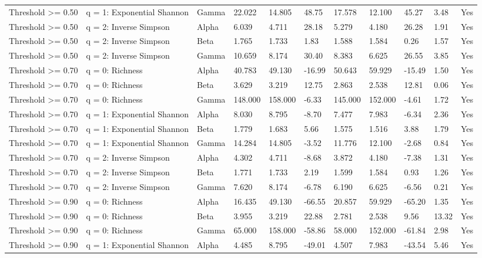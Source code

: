 \begin{landscape}
\begin{longtable}{L{3.0cm}L{2.4cm}L{1.5cm}*{6}{C{1.25cm}}C{1.65cm}C{1.35cm}}
Threshold >= 0.50 & q = 1: Exponential Shannon & Gamma & 22.022 & 14.805 & 48.75 & 17.578 & 12.100 & 45.27 & 3.48 & Yes \\
Threshold >= 0.50 & q = 2: Inverse Simpson & Alpha & 6.039 & 4.711 & 28.18 & 5.279 & 4.180 & 26.28 & 1.91 & Yes \\
Threshold >= 0.50 & q = 2: Inverse Simpson & Beta & 1.765 & 1.733 & 1.83 & 1.588 & 1.584 & 0.26 & 1.57 & Yes \\
Threshold >= 0.50 & q = 2: Inverse Simpson & Gamma & 10.659 & 8.174 & 30.40 & 8.383 & 6.625 & 26.55 & 3.85 & Yes \\
Threshold >= 0.70 & q = 0: Richness & Alpha & 40.783 & 49.130 & -16.99 & 50.643 & 59.929 & -15.49 & 1.50 & Yes \\
Threshold >= 0.70 & q = 0: Richness & Beta & 3.629 & 3.219 & 12.75 & 2.863 & 2.538 & 12.81 & 0.06 & Yes \\
Threshold >= 0.70 & q = 0: Richness & Gamma & 148.000 & 158.000 & -6.33 & 145.000 & 152.000 & -4.61 & 1.72 & Yes \\
Threshold >= 0.70 & q = 1: Exponential Shannon & Alpha & 8.030 & 8.795 & -8.70 & 7.477 & 7.983 & -6.34 & 2.36 & Yes \\
Threshold >= 0.70 & q = 1: Exponential Shannon & Beta & 1.779 & 1.683 & 5.66 & 1.575 & 1.516 & 3.88 & 1.79 & Yes \\
Threshold >= 0.70 & q = 1: Exponential Shannon & Gamma & 14.284 & 14.805 & -3.52 & 11.776 & 12.100 & -2.68 & 0.84 & Yes \\
Threshold >= 0.70 & q = 2: Inverse Simpson & Alpha & 4.302 & 4.711 & -8.68 & 3.872 & 4.180 & -7.38 & 1.31 & Yes \\
Threshold >= 0.70 & q = 2: Inverse Simpson & Beta & 1.771 & 1.733 & 2.19 & 1.599 & 1.584 & 0.93 & 1.26 & Yes \\
Threshold >= 0.70 & q = 2: Inverse Simpson & Gamma & 7.620 & 8.174 & -6.78 & 6.190 & 6.625 & -6.56 & 0.21 & Yes \\
Threshold >= 0.90 & q = 0: Richness & Alpha & 16.435 & 49.130 & -66.55 & 20.857 & 59.929 & -65.20 & 1.35 & Yes \\
Threshold >= 0.90 & q = 0: Richness & Beta & 3.955 & 3.219 & 22.88 & 2.781 & 2.538 & 9.56 & 13.32 & Yes \\
Threshold >= 0.90 & q = 0: Richness & Gamma & 65.000 & 158.000 & -58.86 & 58.000 & 152.000 & -61.84 & 2.98 & Yes \\
Threshold >= 0.90 & q = 1: Exponential Shannon & Alpha & 4.485 & 8.795 & -49.01 & 4.507 & 7.983 & -43.54 & 5.46 & Yes \\

\end{longtable}
\end{landscape}
